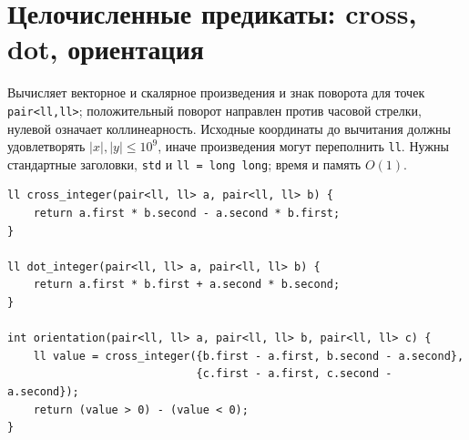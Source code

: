 \section{Целочисленные предикаты: cross, dot, ориентация}
Вычисляет векторное и скалярное произведения и знак поворота для точек \texttt{pair<ll,ll>}; положительный поворот направлен против часовой стрелки, нулевой означает коллинеарность.
Исходные координаты до вычитания должны удовлетворять $|x|,|y|\le10^9$, иначе произведения могут переполнить \texttt{ll}.
Нужны стандартные заголовки, \texttt{std} и \texttt{ll = long long}; время и память $O(1)$.
\begin{lstlisting}[name=geometry_integer]
ll cross_integer(pair<ll, ll> a, pair<ll, ll> b) {
    return a.first * b.second - a.second * b.first;
}

ll dot_integer(pair<ll, ll> a, pair<ll, ll> b) {
    return a.first * b.first + a.second * b.second;
}

int orientation(pair<ll, ll> a, pair<ll, ll> b, pair<ll, ll> c) {
    ll value = cross_integer({b.first - a.first, b.second - a.second},
                             {c.first - a.first, c.second - a.second});
    return (value > 0) - (value < 0);
}
\end{lstlisting}
%

